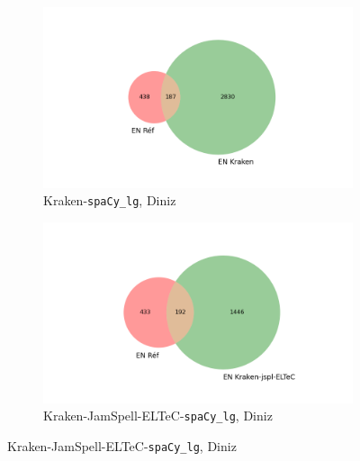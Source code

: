 \begin{figure}
\begin{minipage}{7cm}
  \begin{subfigure}{1\textwidth}
  \includegraphics[width=1\textwidth]{IMAGES/ELTeC_INTERSECTIONS_spaCy3.5.1/DINIZ_Familia-Inglezia_krakenbase.txt_spacy-lg-concat.json_intersection.png} 
  \caption{Kraken-\texttt{spaCy\_lg}, Diniz}
  \label{fig:DINIZ_INTERSECTION_sous_fig}
  \end{subfigure}
  \end{minipage}
  \begin{minipage}{7cm}
  \begin{subfigure}{1\textwidth}
  \includegraphics[width=1\textwidth]{IMAGES/ELTeC_INTERSECTIONS_spaCy3.5.1/DINIZ_Familia-Inglezia_krakenbase_jamspell-ELTeCmodel-por.txt_spacy-lg-concat.json_intersection.png}
  \caption{Kraken-JamSpell-ELTeC-\texttt{spaCy\_lg}, Diniz}
  \label{fig:DINIZ_INTERSECTION_sous_fig_2}
  \end{subfigure}
    \end{minipage}
    \begin{minipage}{7cm}

\end{minipage}
\end{figure}
